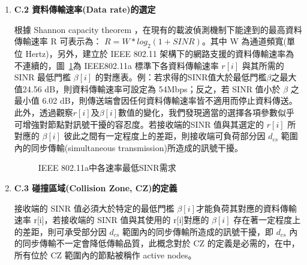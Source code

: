 \documentclass[12pt,a4paper]{article}
\newcommand{\Fig}[1]{圖~\ref{#1}}
\begin{document}
\begin{description}
\begin{enumerate}
\item [\bf ]{\textbf{\Kai C.2 資料傳輸速率(Data rate)的選定 }}\\
\vspace{-2mm}

根據 Shannon capacity theorem \cite{book2002_wc}，在現有的載波偵測機制下能達到的最高資料傳輸速率 R 可表示為： $R = W*log_{2}(1+SINR)$。其中 W 為通道頻寬(單位 Hertz)，另外，建立於 IEEE 802.11 架構下的網路支援的資料傳輸速率為不連續的，\Fig{fig:sinr_thre}為 IEEE802.11a 標準\cite{ieee802.11a}下各資料傳輸速率 $r[i]$ 與其所需的 SINR 最低門檻 $\beta[i]$ 的對應表。例：若求得的SINR值大於最低門檻$\beta$之最大值24.56 dB，則資料傳輸速率可設定為 54Mbps；反之，若 SINR 值小於 $\beta$ 之最小值 6.02 dB，則傳送端會因任何資料傳輸速率皆不適用而停止資料傳送。此外，透過觀察$r[i]$及$\beta[i]$數值的變化，我們發現適當的選擇各項參數似乎可增強對節點對訊號干擾的容忍度。若接收端的SINR 值與其選定的 $r[i]$ 所對應的 $\beta[i]$ 彼此之間有一定程度上的差距，則接收端可負荷部分因 $d_{cs}$ 範圍內的同步傳輸(simultaneous transmission)所造成的訊號干擾。 \\

\begin{figure}[hbt]
\begin{center}
\caption{IEEE 802.11a中各速率最低SINR需求} \label{fig:sinr_thre}
\vspace{-0.2cm}
\end{center}
\end{figure}

\item [\bf ]{\textbf{\Kai C.3 碰撞區域(Collision Zone, CZ)的定義  }}\\
\vspace{-2mm}

接收端的 SINR 值必須大於特定的最低門檻 $\beta[i]$才能負荷其對應的資料傳輸速率 r[i]，若接收端的 SINR 值與其使用的 r[i]對應的 $\beta[i]$ 存在著一定程度上的差距，則可承受部分因 $d_{cs}$ 範圍內的同步傳輸所造成的訊號干擾，即 $d_{cs}$ 內的同步傳輸不一定會降低傳輸品質，此概念對於 CZ 的定義是必需的，在\cite{tn00_cali}中，所有位於 CZ 範圍內的節點被稱作 active nodes。 


\end{enumerate}
\end{description}
\end{document}
